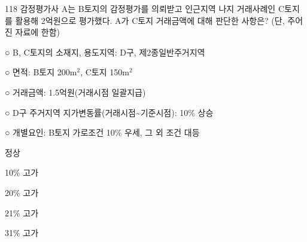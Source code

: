 \begin{question}{118}
감정평가사 A는 B토지의 감정평가를 의뢰받고 인근지역 나지 거래사례인 C토지를 활용해 2억원으로 평가했다. A가 C토지 거래금액에 대해 판단한 사항은? (단, 주어진 자료에 한함)
\begin{framedtext}
○ B, C토지의 소재지, 용도지역: D구, 제2종일반주거지역 \par
○ 면적: B토지 200m$^2$, C토지 150m$^2$ \par
○ 거래금액: 1.5억원(거래시점 일괄지급) \par
○ D구 주거지역 지가변동률(거래시점\textasciitilde 기준시점): 10\% 상승 \par
○ 개별요인: B토지 가로조건 10\% 우세, 그 외 조건 대등
\end{framedtext}
\begin{choices}
  \item 정상
  \item 10\% 고가
  \item 20\% 고가
  \item 21\% 고가
  \item 31\% 고가
\end{choices}
\end{question}
